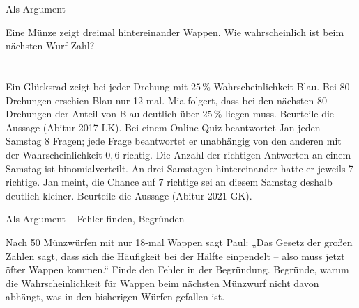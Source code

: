 \setcounter{aufgabe}{13}

\begin{aufgabe}{Als Argument}
\begin{teile}
\teil Eine Münze zeigt dreimal hintereinander Wappen. Wie wahrscheinlich ist beim nächsten Wurf Zahl? \\  \\  \\ 
\teil Ein Glücksrad zeigt bei jeder Drehung mit $25\,\%$ Wahrscheinlichkeit Blau. Bei 80 Drehungen erschien Blau nur 12-mal. Mia folgert, dass bei den nächsten 80 Drehungen der Anteil von Blau deutlich über $25\,\%$ liegen muss. Beurteile die Aussage \hfill (Abitur 2017 LK).
\teil Bei einem Online-Quiz beantwortet Jan jeden Samstag 8 Fragen; jede Frage beantwortet er unabhängig von den anderen mit der Wahrscheinlichkeit $0{,}6$ richtig. Die Anzahl der richtigen Antworten an einem Samstag ist binomialverteilt. An drei Samstagen hintereinander hatte er jeweils 7 richtige. Jan meint, die Chance auf 7 richtige sei an diesem Samstag deshalb deutlich kleiner. Beurteile die Aussage \hfill (Abitur 2021 GK).
\end{teile}
\end{aufgabe}

\begin{aufgabe}{Als Argument – Fehler finden, Begründen}
\begin{teile}
\teil Nach 50 Münzwürfen mit nur 18-mal Wappen sagt Paul: „Das Gesetz der großen Zahlen sagt, dass sich die Häufigkeit bei der Hälfte einpendelt – also muss jetzt öfter Wappen kommen.“ Finde den Fehler in der Begründung.
\teil Begründe, warum die Wahrscheinlichkeit für Wappen beim nächsten Münzwurf nicht davon abhängt, was in den bisherigen Würfen gefallen ist.
\end{teile}
\end{aufgabe}
